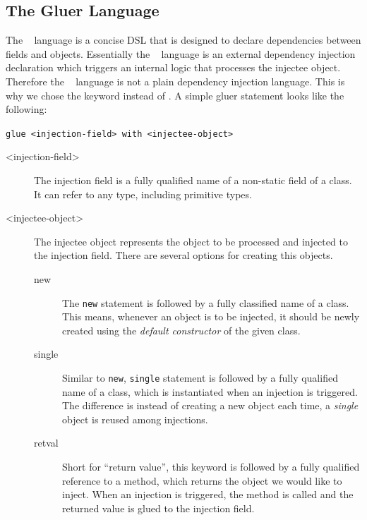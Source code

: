 \subsection{The Gluer Language}
The \gluer~ language is a concise DSL that is designed to declare dependencies between fields and objects. Essentially the \gluer~ language is an external dependency injection declaration which triggers an internal logic that processes the injectee object. Therefore the \gluer~ language is not a plain dependency injection language. This is why we chose the keyword  instead of . A simple gluer statement looks like the following:

\lstinline~glue <injection-field> with <injectee-object>~

\begin{description}
\item[<injection-field>] The injection field is a fully qualified name of a non-static field of a class. It can refer to any type, including primitive types. 
\end{description}

\begin{description}
\item[<injectee-object>] The injectee object represents the object to be processed and injected to the injection field. There are several options for creating this objects.
	\begin{description}
	\item[new] The \lstinline{new} statement is followed by a fully classified name of a class. This means, whenever an object is to be injected, it should be newly created using the \emph{default constructor} of the given class. 

	\item[single] Similar to \lstinline{new}, \lstinline{single} statement is followed by a fully qualified name of a class, which is instantiated when an injection is triggered. The difference is instead of creating a new object each time, a \emph{single} object is reused among injections.

	\item[retval] Short for ``return value'', this keyword is followed by a fully qualified reference to a method, which returns the object we would like to inject. When an injection is triggered, the method is called and the returned value is glued to the injection field.
	\end{description}
\end{description}

